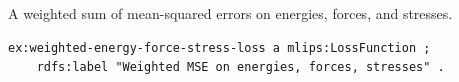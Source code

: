 A weighted sum of mean-squared errors on energies, forces, and stresses.
\begin{lstlisting}[language=turtle]
ex:weighted-energy-force-stress-loss a mlips:LossFunction ;
    rdfs:label "Weighted MSE on energies, forces, stresses" .
\end{lstlisting}
